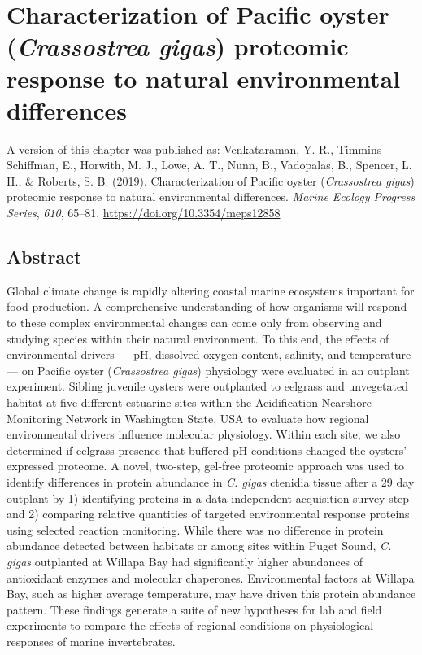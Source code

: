 \documentclass [11pt, proquest] {uwthesis}[2015/03/03]
\begin{document}
\hypertarget{characterization-of-pacific-oyster-crassostrea-gigas-proteomic-response-to-natural-environmental-differences}{%
\chapter{\texorpdfstring{Characterization of Pacific oyster (\emph{Crassostrea gigas}) proteomic response to natural environmental differences}{Characterization of Pacific oyster (Crassostrea gigas) proteomic response to natural environmental differences}}\label{characterization-of-pacific-oyster-crassostrea-gigas-proteomic-response-to-natural-environmental-differences}}

A version of this chapter was published as: Venkataraman, Y. R., Timmins-Schiffman, E., Horwith, M. J., Lowe, A. T., Nunn, B., Vadopalas, B., Spencer, L. H., \& Roberts, S. B. (2019). Characterization of Pacific oyster (\emph{Crassostrea gigas}) proteomic response to natural environmental differences. \emph{Marine Ecology Progress Series}, \emph{610}, 65--81. \url{https://doi.org/10.3354/meps12858}

\hypertarget{abstract}{%
\section{Abstract}\label{abstract}}

Global climate change is rapidly altering coastal marine ecosystems important for food production. A comprehensive understanding of how organisms will respond to these complex environmental changes can come only from observing and studying species within their natural environment. To this end, the effects of environmental drivers --- pH, dissolved oxygen content, salinity, and temperature --- on Pacific oyster (\emph{Crassostrea gigas}) physiology were evaluated in an outplant experiment. Sibling juvenile oysters were outplanted to eelgrass and unvegetated habitat at five different estuarine sites within the Acidification Nearshore Monitoring Network in Washington State, USA to evaluate how regional environmental drivers influence molecular physiology. Within each site, we also determined if eelgrass presence that buffered pH conditions changed the oysters' expressed proteome. A novel, two-step, gel-free proteomic approach was used to identify differences in protein abundance in \emph{C. gigas} ctenidia tissue after a 29 day outplant by 1) identifying proteins in a data independent acquisition survey step and 2) comparing relative quantities of targeted environmental response proteins using selected reaction monitoring. While there was no difference in protein abundance detected between habitats or among sites within Puget Sound, \emph{C. gigas} outplanted at Willapa Bay had significantly higher abundances of antioxidant enzymes and molecular chaperones. Environmental factors at Willapa Bay, such as higher average temperature, may have driven this protein abundance pattern. These findings generate a suite of new hypotheses for lab and field experiments to compare the effects of regional conditions on physiological responses of marine invertebrates.
\end{document}

